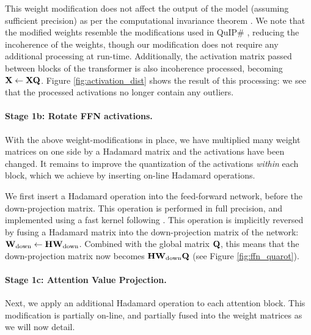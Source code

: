This weight modification does not affect the output of the model (assuming sufficient precision) as per the computational invariance theorem \citep{slicegpt}. We note that the modified weights resemble the modifications used in QuIP\# \citep{QuIPsharp}, reducing the incoherence of the weights, though our modification does not require any additional processing at run-time. Additionally, the activation matrix passed between blocks of the transformer is also incoherence processed, becoming ${\mathbf{X}} \leftarrow{\mathbf{X}} {\mathbf{Q}}$. Figure \ref{fig:activation_dist} shows the result of this processing: we see that the processed activations no longer contain any outliers.  


\paragraph{Stage 1b: Rotate FFN activations.}
With the above weight-modifications in place, we have multiplied many weight matrices on one side by a Hadamard matrix and the activations have been changed. It remains to improve the quantization of the activations \emph{within} each block, which we achieve by inserting on-line Hadamard operations. 

We first insert a Hadamard operation into the feed-forward network, before the down-projection matrix. This operation is performed in full precision, and implemented using a fast kernel following \citet{QuIPsharp}. This operation is implicitly reversed by fusing a Hadamard matrix into the down-projection matrix of the network: ${\mathbf{W}}_\textrm{down} \leftarrow {\mathbf{H}} {\mathbf{W}}_\textrm{down}$. Combined with the global matrix ${\mathbf{Q}}$, this means that the down-projection matrix now becomes ${\mathbf{H}} {\mathbf{W}}_\textrm{down}{\mathbf{Q}}$ (see Figure \ref{fig:ffn_quarot}). 

\paragraph{Stage 1c: Attention Value Projection.}

Next, we apply an additional Hadamard operation to each attention block.  This modification is partially on-line, and partially fused into the weight matrices as we will now detail. 

